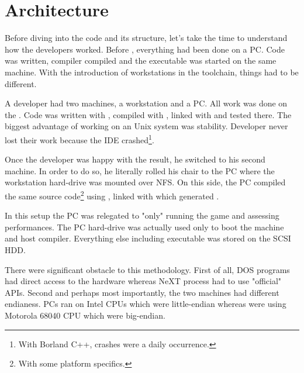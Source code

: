 \section{Architecture}
Before diving into the code and its structure, let's take the time to understand how the developers worked. Before \doom, everything had been done on a PC. Code was written, compiler compiled and the executable was started on the same machine. With the introduction of \NeXT workstations in the toolchain, things had to be different.\\
\par
A developer had two machines, a \NeXT workstation and a PC. All work was done on the \NeXT. Code was written with , compiled with , linked with  and tested there. The biggest advantage of working on an Unix system was stability. Developer never lost their work because the IDE crashed\footnote{With Borland C++, crashes were a daily occurrence.}.\\
\par
Once the developer was happy with the result, he switched to his second machine. In order to do so, he literally rolled his chair to the PC where the \NeXT workstation hard-drive was mounted over NFS. On this side, the PC compiled the same source code\footnote{With some platform specifics.} using , linked with  which generated . \\
\par
 In this setup the PC was relegated to "only" running the game and assessing performances. The PC hard-drive was actually used only to boot the machine and host  compiler. Everything else including  executable was stored on the \NeXT SCSI HDD.\\
\par
There were significant obstacle to this methodology. First of all, DOS programs had direct access to the hardware whereas NeXT process had to use "official" APIs. Second and perhaps most importantly, the two machines had different endianess. PCs ran on Intel CPUs which were little-endian whereas \NeXT were using Motorola 68040 CPU which were big-endian.\\
\vspace{2mm}
\par
\begin{figure}[H]
\centering
{}
\end{figure}
\par



